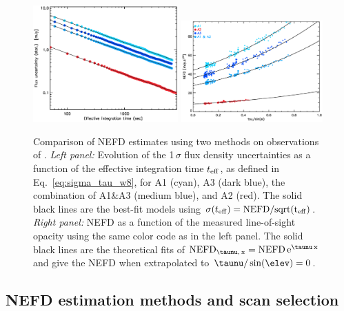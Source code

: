 \begin{figure}[!thbp]
  \begin{center}
    \includegraphics[trim={0.5cm, 0, 0, 0.5cm}, clip, angle=0, width=0.495\textwidth]{Figures/hls_nefd_vst.eps}
    \includegraphics[trim={0.5cm, 0, 0.2cm, 0.5cm}, clip, angle=0, width=0.485\textwidth]{Figures/hls_NEFD_vs_TauElev_all.eps}
    \caption{Comparison of NEFD estimates using two methods on observations of
      \hls. \emph{Left panel:} Evolution of the 1\,$\sigma$ flux density
      uncertainties as a function of the effective integration time
      $t_{\rm{eff}}$, as defined in Eq.~\ref{eq:sigma_tau_w8}, for A1
    (cyan), A3 (dark blue), the combination of A1\&A3 (medium blue),
    and A2 (red). The solid black lines are the best-fit models using
    $\sigma(t_{\rm{eff}}) =  \rm{NEFD}/sqrt(t_{\rm{eff}})$. \emph{Right panel:} NEFD as a function of the
    measured line-of-sight opacity using the same color code as in the
    left panel. The solid black lines are the theoretical
    fits of $\rm{NEFD}_{\taunu,\, x } = \rm{NEFD}\, e^{\taunu\,x}$ and give the
    NEFD when extrapolated to $\taunu/\sin(\elev)= 0$. }
    \label{fig:nefd_twomethods}
  \end{center}
\end{figure}

\subsection{NEFD estimation methods and scan selection}
\label{se:nefd_method}

